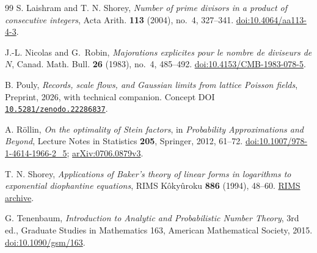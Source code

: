 \begin{thebibliography}{99}
S. Laishram and T. N. Shorey,
\emph{Number of prime divisors in a product of consecutive integers},
Acta Arith. \textbf{113} (2004), no.~4, 327--341.
\href{https://doi.org/10.4064/aa113-4-3}{doi:10.4064/aa113-4-3}.

J.-L. Nicolas and G.~Robin,
\emph{Majorations explicites pour le nombre de diviseurs de $N$},
Canad. Math. Bull. \textbf{26} (1983), no.~4, 485--492.
\href{https://doi.org/10.4153/CMB-1983-078-5}{doi:10.4153/CMB-1983-078-5}.

B. Pouly,
\emph{Records, scale flows, and Gaussian limits from lattice Poisson fields},
Preprint, 2026, with technical companion.
Concept DOI \href{https://doi.org/10.5281/zenodo.22286837}{\nolinkurl{10.5281/zenodo.22286837}}.

A. R\"ollin,
\emph{On the optimality of Stein factors},
in \emph{Probability Approximations and Beyond}, Lecture Notes in Statistics
\textbf{205}, Springer, 2012, 61--72.
\href{https://doi.org/10.1007/978-1-4614-1966-2_5}{doi:10.1007/978-1-4614-1966-2\_5};
\href{https://arxiv.org/abs/0706.0879v3}{arXiv:0706.0879v3}.

T. N. Shorey,
\emph{Applications of Baker's theory of linear forms in logarithms to
exponential diophantine equations},
RIMS K\^oky\^uroku \textbf{886} (1994), 48--60.
\href{https://www.kurims.kyoto-u.ac.jp/~kyodo/kokyuroku/contents/pdf/0886-05.pdf}{RIMS archive}.

G. Tenenbaum,
\emph{Introduction to Analytic and Probabilistic Number Theory},
3rd ed., Graduate Studies in Mathematics 163, American Mathematical Society, 2015.
\href{https://doi.org/10.1090/gsm/163}{doi:10.1090/gsm/163}.

\end{thebibliography}
